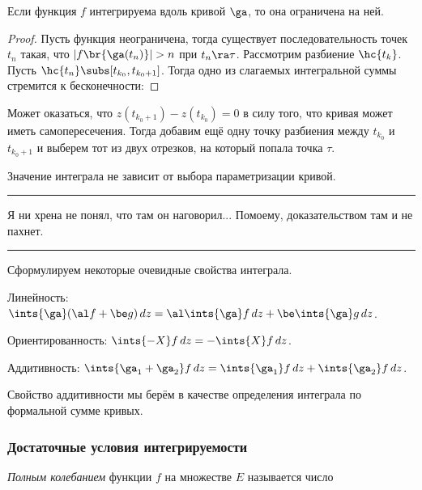 \documentclass[a4paper]{article}
\newenvironment{petit}
{\par \smallskip \hrule \smallskip \footnotesize}
{\par \smallskip \hrule \smallskip}
\begin{document}
\begin{solution}
\begin{theorem}
Если функция $f$ интегрируема вдоль кривой $\ga$, то она ограничена на ней.
\end{theorem}
\begin{proof}
Пусть функция неограничена, тогда существует последовательность точек $t_n$ такая, что ${|f\br{\ga(t_n)}|>n}$
при $t_n\ra\tau$. Рассмотрим разбиение $\hc{t_k}$. Пусть $\hc{t_n}\subs[t_{k_0},t_{k_0+1}]$.
Тогда одно из слагаемых интегральной суммы стремится к бесконечности:
\hfill\end{proof}
\begin{note}
Может оказаться, что $z(t_{k_0+1})-z(t_{k_0})=0$ в силу того, что кривая может иметь самопересечения. Тогда добавим
ещё одну точку разбиения между $t_{k_0}$ и $t_{k_0+1}$ и выберем тот из двух отрезков, на который попала точка $\tau$.
\end{note}

\begin{theorem}
Значение интеграла не зависит от выбора параметризации кривой.
\end{theorem}
\begin{petit}
Я ни хрена не понял, что там он наговорил... По\д моему, доказательством там и не пахнет.
\end{petit}

Сформулируем некоторые очевидные свойства интеграла.

\begin{items}{-2}
\item Линейность: $\ints{\ga}(\al f + \be g)\,dz = \al\ints{\ga}f\,dz + \be\ints{\ga}g\,dz$.

\item Ориентированность: $\ints{-X}f\,dz = -\ints{X}f\,dz$.

\item Аддитивность: $\ints{\ga_1 + \ga_2}f\,dz = \ints{\ga_1}f\,dz + \ints{\ga_2}f\,dz$.
\end{items}

Свойство аддитивности мы берём в качестве определения интеграла по формальной сумме кривых.

\subsubsection{Достаточные условия интегрируемости}

\begin{df}
\emph{Полным колебанием} функции $f$ на множестве $E$ называется число
\end{df}


\end{solution}
\end{document}
